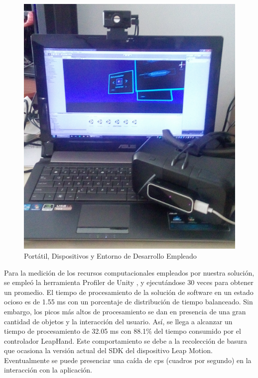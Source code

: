 \documentclass[conference]{IEEEtran}
\begin{document}
\begin{figure}[htpb!]
 \centering 
\includegraphics[width=0.75\columnwidth]{images/equipmentpng.png}
\caption{Port\'atil, Dispositivos y Entorno de Desarrollo Empleado}
\label{fig:equipment}
\end{figure}

Para la medición de los recursos computacionales empleados por nuestra solución, se empleó la herramienta Profiler de Unity \cite{PROFILER}, y ejecutándose 30 veces para obtener un promedio. El tiempo de procesamiento de la solución de software en un estado ocioso es de 1.55 ms con un porcentaje de distribución de tiempo balanceado. Sin embargo, los picos más altos de procesamiento se dan en presencia de una gran cantidad de objetos y la interacción del usuario. Así, se llega a alcanzar un tiempo de procesamiento de 32.05 ms con 88.1\% del tiempo consumido por el controlador LeapHand. Este comportamiento se debe a la recolección de basura que ocasiona la versión actual del SDK del dispositivo Leap Motion. Eventualmente se puede presenciar una caída de cps (cuadros por segundo) en la interacción con la aplicación.
\end{document}
